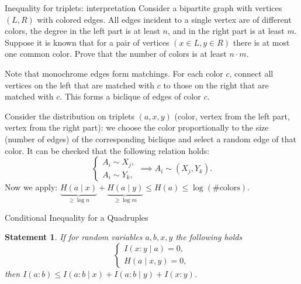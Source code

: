 \documentclass[aspectratio=169]{beamer}
\newtheorem{statement}{Statement}
\begin{document}
    \begin{frame}{Inequality for triplets: interpretation}
        Consider a bipartite graph with vertices \((L, R)\) with colored edges.
        All edges incident to a single vertex are of different colors, the degree in the left part is at least \(n\),
        and in the right part is at least \(m\). Suppose it is known that for a pair of vertices \((x \in L, y \in R)\)
        there is at most one common color. Prove that the number of colors is at least \(n \cdot m\).

        Note that monochrome edges form matchings. For each color \(c\), connect all
        vertices on the left that are matched with \(c\) to those on the right that are matched with \(c\). This forms a biclique of
        edges of color \(c\).

        Consider the distribution on triplets \((a, x, y)\) (color, vertex from the left part, vertex from the right
        part): we choose the color proportionally to the size (number of edges) of the corresponding biclique and
        select a random edge of that color. It can be checked that the following relation holds:
    \[
        \begin{cases}
            A_i \sim X_j,\\
            A_i \sim Y_k,
        \end{cases} \implies A_i \sim (X_j, Y_k).
    \]
    Now we apply: \(\underbrace{H(a \mid x)}_{\ge \log n} +
                      \underbrace{H(a \mid y)}_{\ge \log m} \le H(a) \le \log (\text{\# colors})\).
    \end{frame}

    \begin{frame}{Conditional Inequality for a Quadruples}
		\begin{statement}
		    If for random variables \(a, b, x, y\) the following holds
		    \[
		        \begin{cases}
		            I(x:y \mid a) = 0,\\
		            H(a \mid x, y) = 0,
		        \end{cases}
		    \]
		    then \(I(a:b) \le I(a:b \mid x) + I(a:b \mid y) + I(x:y)\).
		\end{statement}
    \end{frame}
\end{document}
